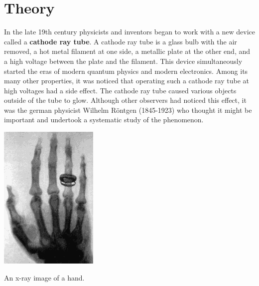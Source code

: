 \section{Theory}
In the late 19th century physicists and inventors began to work with a new device called a {\bf cathode ray tube}. A cathode ray tube is a glass bulb with the air removed, a hot metal filament at one side, a metallic plate at the other end, and a high voltage between the plate and the filament. This device simultaneously started the eras of modern quantum physics and modern electronics. Among its many other properties, it was noticed that operating such a cathode ray tube at high voltages had a side effect. The cathode ray tube caused various objects outside of the tube to glow. Although other observers had noticed this effect, it was the german physicist Wilhelm R\"{o}ntgen (1845-1923) who thought it might be important and undertook a systematic study of the phenomenon.

\begin{marginfigure}
\includegraphics[width=\textwidth]{X-Ray-Diffraction-handxray.png}
\caption{An x-ray image of a hand.}
\label{fig:xr1}
\end{marginfigure}

